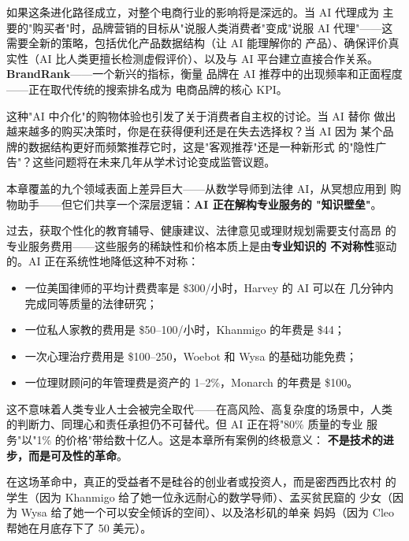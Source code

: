 如果这条进化路径成立，对整个电商行业的影响将是深远的。当 AI 代理成为
主要的"购买者"时，品牌营销的目标从"说服人类消费者"变成"说服 AI
代理"——这需要全新的策略，包括优化产品数据结构（让 AI 能理解你的
产品）、确保评价真实性（AI 比人类更擅长检测虚假评价）、以及与 AI
平台建立直接合作关系。\textbf{BrandRank}——一个新兴的指标，衡量
品牌在 AI 推荐中的出现频率和正面程度——正在取代传统的搜索排名成为
电商品牌的核心 KPI。

这种"AI 中介化"的购物体验也引发了关于消费者自主权的讨论。当 AI 替你
做出越来越多的购买决策时，你是在获得便利还是在失去选择权？当 AI 因为
某个品牌的数据结构更好而频繁推荐它时，这是"客观推荐"还是一种新形式
的"隐性广告"？这些问题将在未来几年从学术讨论变成监管议题。

\bigskip

\begin{whybox}
本章覆盖的九个领域表面上差异巨大——从数学导师到法律 AI，从冥想应用到
购物助手——但它们共享一个深层逻辑：\textbf{AI 正在解构专业服务的
"知识壁垒"}。

过去，获取个性化的教育辅导、健康建议、法律意见或理财规划需要支付高昂
的专业服务费用——这些服务的稀缺性和价格本质上是由\textbf{专业知识的
不对称性}驱动的。AI 正在系统性地降低这种不对称：

\begin{itemize}
  \item 一位美国律师的平均计费费率是 \$300/小时，Harvey 的 AI 可以在
    几分钟内完成同等质量的法律研究；
  \item 一位私人家教的费用是 \$50--100/小时，Khanmigo 的年费是 \$44；
  \item 一次心理治疗费用是 \$100--250，Woebot 和 Wysa 的基础功能免费；
  \item 一位理财顾问的年管理费是资产的 1--2\%，Monarch 的年费是 \$100。
\end{itemize}

这不意味着人类专业人士会被完全取代——在高风险、高复杂度的场景中，人类
的判断力、同理心和责任承担仍不可替代。但 AI 正在将"80\% 质量的专业
服务"以"1\% 的价格"带给数十亿人。这是本章所有案例的终极意义：
\textbf{不是技术的进步，而是可及性的革命}。

在这场革命中，真正的受益者不是硅谷的创业者或投资人，而是密西西比农村
的学生（因为 Khanmigo 给了她一位永远耐心的数学导师）、孟买贫民窟的
少女（因为 Wysa 给了她一个可以安全倾诉的空间）、以及洛杉矶的单亲
妈妈（因为 Cleo 帮她在月底存下了 50 美元）。
\end{whybox}



